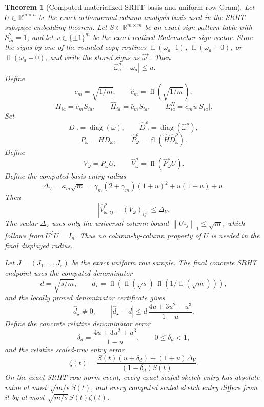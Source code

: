 \documentclass[11pt]{article}
\newcommand{\R}{\mathbb{R}}
\newcommand{\NormOne}[1]{\left\lVert #1\right\rVert_1}
\newcommand{\fl}{\operatorname{fl}}
\newcommand{\I}{I}
\newcommand{\diag}{\operatorname{diag}}
\newtheorem{theorem}{Theorem}
\theoremstyle{remark}
\begin{document}
\begin{theorem}[Computed materialized SRHT basis and uniform-row Gram]
Let \(U\in\R^{m\times n}\) be the exact orthonormal-column analysis basis used
in the SRHT subspace-embedding theorem.  Let \(S\in\R^{m\times m}\) be an exact
sign-pattern table with \(S_{ia}^2=1\), and let
\(\omega\in\{\pm1\}^m\) be the exact realized Rademacher sign vector.  Store
the signs by one of the rounded copy routines
\(\fl(\omega_a\cdot1)\), \(\fl(\omega_a+0)\), or \(\fl(\omega_a-0)\), and
write the stored signs as \(\widehat\omega^\rho\).  Then
\[
  |\widehat\omega^\rho_a-\omega_a|\le u .
\]
Define
\[
  c_m=\sqrt{1/m},\qquad \widehat c_m=\fl(\sqrt{1/m}),
\]
\[
  H_{ia}=c_mS_{ia},\qquad
  \widehat H_{ia}=\widehat c_mS_{ia},
  \qquad
  E^H_{ia}=c_mu|S_{ia}|.
\]
Set
\[
  D_\omega=\diag(\omega),\qquad
  \widehat D_\omega^\rho=\diag(\widehat\omega^\rho),
\]
\[
  P_\omega=HD_\omega,\qquad
  \widehat P_\omega^\rho=\fl(\widehat H\widehat D_\omega^\rho).
\]
Define
\[
  V_\omega=P_\omega U,\qquad
  \widehat V_\omega^\rho=\fl(\widehat P_\omega^\rho U).
\]
Define the computed-basis entry radius
\[
  \Delta_V
  =
  \kappa_m\sqrt m
  =
  \gamma_m(2+\gamma_m)(1+u)^2+u(1+u)+u .
\]
Then
\[
  |\widehat V^\rho_{\omega,ij}-(V_\omega)_{ij}|
  \le
  \Delta_V .
\]
The scalar \(\Delta_V\) uses only the universal column bound
\(\NormOne{U_{*j}}\le\sqrt m\), which follows from \(U^TU=\I_n\).  Thus no
column-by-column property of \(U\) is needed in the final displayed radius.

Let \(J=(J_1,\ldots,J_s)\) be the exact uniform row sample.  The final concrete
SRHT endpoint uses the computed denominator
\[
  d=\sqrt{s/m},
  \qquad
  \widehat d_\star
  =
  \fl\!\left(
    \fl(\sqrt{s})\,\fl(1/\fl(\sqrt m))
  \right),
\]
and the locally proved denominator certificate gives
\[
  \widehat d_\star\ne0,
  \qquad
  |\widehat d_\star-d|
  \le
  d\,\frac{4u+3u^2+u^3}{1-u}.
\]
Define the concrete relative denominator error
\[
  \delta_d=\frac{4u+3u^2+u^3}{1-u},
  \qquad 0\le\delta_d<1,
\]
and the relative scaled-row entry error
\[
  \zeta(t)
  =
  \frac{S(t)(u+\delta_d)+(1+u)\Delta_V}
       {(1-\delta_d)S(t)}.
\]
On the exact SRHT row-norm event, every exact scaled sketch entry has absolute
value at most \(\sqrt{m/s}\,S(t)\), and every computed scaled sketch entry
differs from it by at most \(\sqrt{m/s}\,S(t)\zeta(t)\).


\end{theorem}
\end{document}
